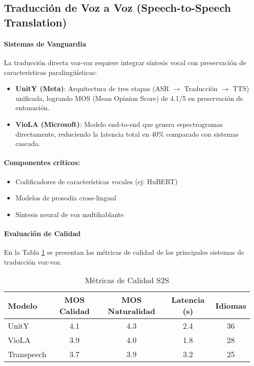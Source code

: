 \subsection{Traducción de Voz a Voz (Speech-to-Speech Translation)}


\paragraph{Sistemas de Vanguardia}
La traducción directa voz-voz requiere integrar síntesis vocal con preservación de características paralingüísticas:

\begin{itemize}
    \item \textbf{UnitY (Meta)}: Arquitectura de tres etapas (ASR $\rightarrow$ Traducción $\rightarrow$ TTS) unificada, logrando MOS (Mean Opinion Score) de 4.1/5 en preservación de entonación\cite{zhou2024preservingspeakerinformationdirect}.
    \item \textbf{VioLA (Microsoft)}: Modelo end-to-end que genera espectrogramas directamente, reduciendo la latencia total en 40\% comparado con sistemas cascada\cite{jia2022cvss}.
\end{itemize}

\paragraph{Componentes críticos:}
\begin{itemize}
    \item Codificadores de características vocales (ej: HuBERT)
    \item Modelos de prosodia cross-lingual
    \item Síntesis neural de voz multihablante
\end{itemize}

\paragraph{Evaluación de Calidad}
En la Tabla \ref{tab:s2s-metrics} se presentan las métricas de calidad de los principales sistemas de traducción voz-voz.

\begin{table}[h]
    \centering
    \caption{Métricas de Calidad S2S}
    \label{tab:s2s-metrics}
    \begin{tabular}{|l|c|c|c|c|}
        \hline
        \textbf{Modelo} & \textbf{MOS Calidad} & \textbf{MOS Naturalidad} & \textbf{Latencia (s)} & \textbf{Idiomas} \\
        \hline
        UnitY & 4.1 & 4.3 & 2.4 & 36 \\
        \hline
        VioLA & 3.9 & 4.0 & 1.8 & 28 \\
        \hline
        Transpeech & 3.7 & 3.9 & 3.2 & 25 \\
        \hline
    \end{tabular}
\end{table}

